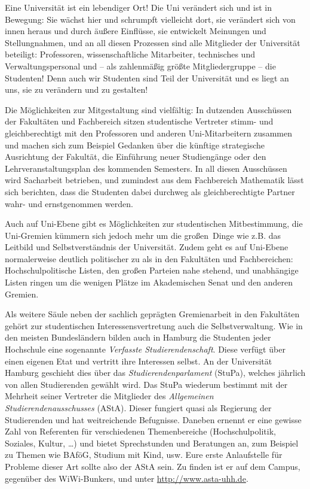 Eine Universität ist ein lebendiger Ort! Die Uni verändert sich und ist in
Bewegung: Sie wächst hier und schrumpft vielleicht dort, sie verändert sich von
innen heraus und durch äußere Einflüsse, sie entwickelt Meinungen und
Stellungnahmen, und an all diesen Prozessen sind alle Mitglieder der
Universität beteiligt: Professoren, wissenschaftliche Mitarbeiter, technisches
und Verwaltungspersonal und -- als zahlenmäßig größte Mitgliedergruppe -- die
Studenten! Denn auch wir Studenten sind Teil der Universität und es liegt an
uns, sie zu verändern und zu gestalten! 

Die Möglichkeiten zur Mitgestaltung sind vielfältig: In dutzenden Ausschüssen
der Fakultäten und Fachbereich sitzen studentische Vertreter stimm- und
gleichberechtigt mit den Professoren und anderen Uni-Mitarbeitern zusammen und
machen sich zum Beispiel Gedanken über die künftige strategische Ausrichtung
der Fakultät, die Einführung neuer Studiengänge oder den Lehrveranstaltungsplan
des kommenden Semesters. In all diesen Ausschüssen wird Sacharbeit betrieben,
und zumindest aus dem Fachbereich Mathematik lässt sich berichten, dass die
Studenten dabei durchweg als gleichberechtigte Partner wahr- und ernstgenommen
werden. 

Auch auf Uni-Ebene gibt es Möglichkeiten zur studentischen Mitbestimmung, die
Uni-Gremien kümmern sich jedoch mehr um die \glqq großen\grqq\ Dinge wie z.B.
das Leitbild und Selbstverständnis der Universität. Zudem geht es auf Uni-Ebene
normalerweise deutlich politischer zu als in den Fakultäten und Fachbereichen:
Hochschulpolitische Listen, den großen Parteien nahe stehend, und unabhängige
Listen ringen um die wenigen Plätze im Akademischen Senat und den anderen
Gremien.

Als weitere Säule neben der sachlich geprägten Gremienarbeit in den Fakultäten
gehört zur studentischen Interessensvertretung auch die Selbstverwaltung. Wie
in den meisten Bundesländern bilden auch in Hamburg die Studenten jeder
Hochschule eine sogenannte \emph{Verfasste Studierendenschaft}. Diese verfügt
über einen eigenen Etat und vertritt ihre Interessen selbst. An der Universität
Hamburg geschieht dies über das \emph{Studierendenparlament} (StuPa), welches
jährlich von allen Studierenden gewählt wird. Das StuPa wiederum bestimmt mit
der Mehrheit seiner Vertreter die Mitglieder des \emph{Allgemeinen
Studierendenausschusses} (AStA). Dieser fungiert quasi als Regierung der
Studierenden und hat weitreichende Befugnisse. Daneben ernennt er eine gewisse
Zahl von Referenten für verschiedenen Themenbereiche (Hochschulpolitik,
Soziales, Kultur, \ldots) und bietet Sprechstunden und Beratungen an, zum
Beispiel zu Themen wie BAföG, Studium mit Kind, usw. Eure erste Anlaufstelle
für Probleme dieser Art sollte also der AStA sein. Zu finden ist er auf dem
Campus, gegenüber des WiWi-Bunkers, und unter \url{http://www.asta-uhh.de}.

